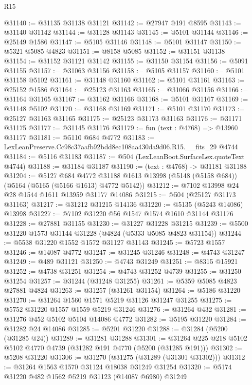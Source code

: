 \begin{lexlean}{R15}
\begin{coremodule}
{{{{{{{{{{{@31140 := @31135 @31138 @31121
@31142 := @27947 @191 @8595
@31143 := @31140 @31142
@31144 := @31128 @31143
@31145 := @5101 @31144
@31146 := @25149 @1586
@31147 := @5105 @31146
@31148 := @5101 @31147
@31150 := @5321 @5085 @4823
@31151 := @8158 @5085
@31152 := @31151 @31138
@31154 := @31152 @31121 @31142
@31155 := @31150 @31154
@31156 := @5091 @31155
@31157 := @31063 @31156
@31158 := @5105 @31157
@31160 := @5101 @31158 @5102
@31161 := @31148 @31160
@31162 := @5101 @31161
@31163 := @25152 @1586
@31164 := @25123 @31163
@31165 := @31066 @31156
@31166 := @31164 @31165
@31167 := @31162 @31166
@31168 := @5101 @31167
@31169 := @31148 @5102
@31170 := @31168 @31169
@31171 := @5101 @31170
@31173 := @25127 @31163 @31165
@31175 := @25123 @31173 @31163
@31176 := @31171 @31175
@31177 := @31145 @31176
@31179 := fun (text : @4768) => @13960 @31177
@31181 := @5110 @684 @4772
@31183 := LexLeanPreserve.Cc98c37aafb92bdd8ec108aa430da9d06.R15.__fits_29 @4744
@31184 := @5116 @31183
@31187 := @504 (LexLeanBoot.SurfaceLex.quoteText @4744)
@31188 := @31184 @31187
@31190 := (text : @4768) -> @31181 @31188
@31204 := @5127
    @684
    @4772
    @31188
    @1613
    @13998
    (@5148 (@5158 @684))
    (@5164 (@5165 (@5166 @1613) @4772 @5142))
@31212 := @7102 @13998 @24 @28 @1544 @1611 @13959 @31177 @14086
@31215 := @504 (@25127 @31173 @31163)
@31217 := @31212 @31215 @14136
@31220 := @5135 (@5243 @14086) @13998
@31227 := @7102 @31220 @56 @1547 @1574 @1610 @31144 @31176
@31228 := @27881 @31155
@31230 := @31227 @31228 @31215
@31239 := @5500 @31220 @1573 @31144 @31228 (@4824 (@5333 @5085 @4823 @31154))
@31244 := @5538 @31220 @1552 @1572 @31127 @31143
@31245 := @5723 @1557
@31246 := @14087 @4772
@31247 := @31245 @31246
@31248 := @4743 @31247
@31249 := @489 @31121
@31250 := @4743 @31249
@31251 := @8315 @15921
@31252 := @4738 @31251
@31254 := @4743 @31252 @4739
@31255 := @31250 @31254
@31257 := @31244 (@31248 @31255)
@31261 := @5359 @5085 @4823 @27881 @4824
@31263 := @31257 (@31261 @31154)
@31264 := @5186 @31220
@31270 := @31264 @1560 @1571 @5219 @31126 @31247 @31255
@31275 := @5752 @31220 @1557 @1559 @5219 @31246
@31276 := @31264 @432
@31281 := @31276 @452 @5102 @5104 @14086 @4772
@31282 := @5195 @31220
@31284 := @31282 @24 @14086
@31285 := @5201 @31220
@31288 := @31284 (@5200 (@31285 @24))
@31289 := @31281 @31288
@31301 := @31264 @225 @218 @5102 @5102 @4770 @4739 (@31282 @191 @4770 (@5200 (@31285 @191)))
@31302 := @5208 @31220
@31306 := @31270 (@31275 (@31289 (@31301 @31302)))
@31312 := @31264 @1563 @1570 @31124 @18038 @31249 @31254
@31320 := @5174 @31220 @482 @1562 @5219 @31123 (@14087 @6980) @31249
}}}}}}}}}}}
\end{coremodule}
\end{lexlean}
